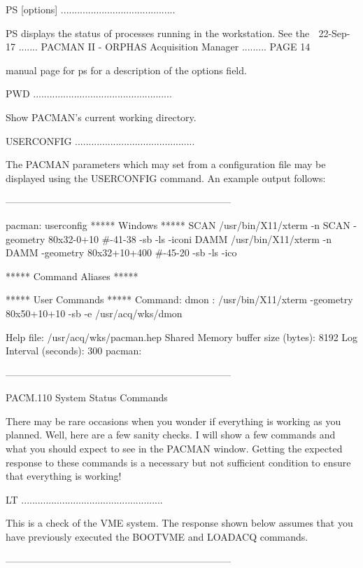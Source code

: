    PS [options] ..........................................
 
   PS  displays  the  status  of processes running in the workstation. See the
    
   22-Sep-17 ....... PACMAN II - ORPHAS Acquisition Manager ......... PAGE  14
 
   manual page for ps for a description of the options field.
 
   PWD ...................................................
 
   Show PACMAN's current working directory.
 
   USERCONFIG ............................................
 
   The PACMAN parameters which may  set  from  a  configuration  file  may  be
   displayed using the USERCONFIG command.  An example output follows:
 
     ---------------------------------------------------------------------
 
   pacman: userconfig
   ***** Windows *****
   SCAN  /usr/bin/X11/xterm -n SCAN -geometry 80x32-0+10 #-41-38 -sb -ls -iconi
   DAMM  /usr/bin/X11/xterm -n DAMM -geometry 80x32+10+400 #-45-20 -sb -ls -ico
 
 
   ***** Command Aliases *****
 
   ***** User Commands *****
   Command: dmon
          : /usr/bin/X11/xterm -geometry 80x50+10+10 -sb -e /usr/acq/wks/dmon
 
   Help file: /usr/acq/wks/pacman.hep
   Shared Memory buffer size (bytes): 8192
   Log Interval (seconds): 300
   pacman:
 
     ---------------------------------------------------------------------
 
 
   PACM.110 System Status Commands
 
   There  may  be  rare  occasions when you wonder if everything is working as
   you planned.  Well, here are a  few  sanity  checks.   I  will  show  a few
   commands  and  what  you should expect to see in the PACMAN window. Getting
   the expected response to these commands is a necessary but  not  sufficient
   condition to ensure that everything is working!
 
   LT ....................................................
 
   This  is  a check of the VME system.  The response shown below assumes that
   you have previously executed the BOOTVME and LOADACQ commands.
 
     ---------------------------------------------------------------------
 
